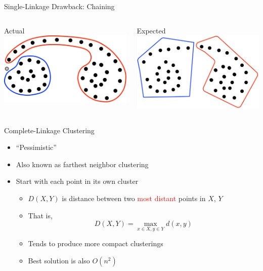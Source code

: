 \documentclass[aspectratio=169]{beamer}
\begin{document}
\begin{frame}{Single-Linkage Drawback: Chaining}

\begin{columns}
\begin{column}{0.5\textwidth}
Actual\\
\includegraphics[width=1\textwidth]{./lectUL/singleLink2.pdf}
\end{column}
\begin{column}{0.5\textwidth}
Expected\\
\includegraphics[width=1\textwidth]{./lectUL/singleLinkExpected.pdf}
\end{column}
\end{columns}
\end{frame}
\begin{frame}{Complete-Linkage Clustering}

\begin{itemize}
\item ``Pessimistic''
\item Also known as farthest neighbor clustering
\item Start with each point in its own cluster
\begin{itemize}
	\item $D(X, Y)$ is distance between two \textcolor {red}{most distant} points in $X$, $Y$
	\item That is, 
	$$D(X, Y) = \max_{x \in X, y \in Y} d(x, y)$$
	\item Tends to produce more compact clusterings
	\item Best solution is also $O(n^2)$
\end{itemize}
\end{itemize}

\end{frame}
\end{document}
